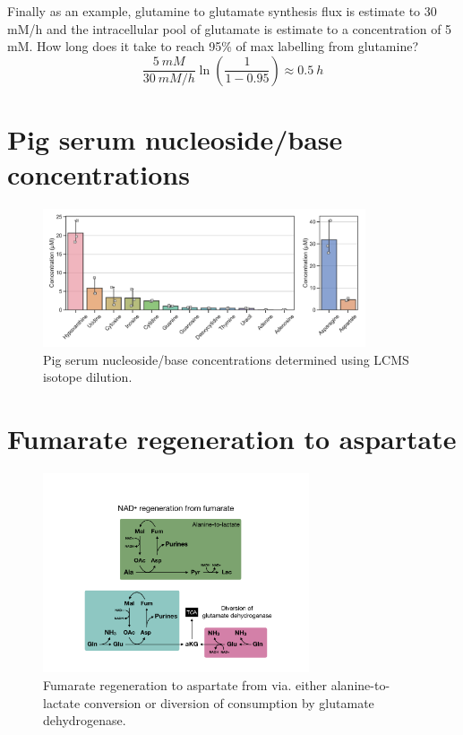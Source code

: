 Finally as an example, glutamine to glutamate synthesis flux is estimate to 30 mM/h and the intracellular pool of glutamate is estimate to a concentration of 5 mM.
How long does it take to reach 95\% of max labelling from glutamine?
\begin{equation}
     \frac{5\ mM}{30\ mM/h} \ln\left( \frac{1}{1 - 0.95} \right) \approx 0.5\ h
\label{eq:app_ch1:B_glu}
\end{equation}





\newpage
\section{Pig serum nucleoside/base concentrations}
\label{chap1_app:serum}
\begin{figure}[ht]
    \centering
    \includegraphics[width=0.85\textwidth]{figures/chap1/app/pig_nucl_conc.pdf}
    \caption[Pig serum nucleoside/base concentrations.]{
    Pig serum nucleoside/base concentrations determined using LCMS isotope dilution.
    }
    \label{fig:app_ch1:pig_nucl_conc}
\end{figure}

\newpage
\section{Fumarate regeneration to aspartate}
\label{chap1_app:fumarate_NAD}
\begin{figure}[ht]
    \centering
    \includegraphics[width=0.7\textwidth]{figures/chap1/app/fumarate_NAD.pdf}
    \caption[Fumarate regeneration to aspartate.]{
    Fumarate regeneration to aspartate from via. either alanine-to-lactate conversion or diversion of \NAD{} consumption by glutamate dehydrogenase.
    }
    \label{fig:app_ch1:fumarate_NAD}
\end{figure}
